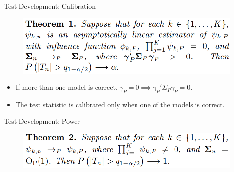 \documentclass{beamer}
\begin{document}
\begin{frame}{Test Development: Calibration}
	\begin{figure}
		\center
		\includegraphics[scale=0.3]{theorem1.png}
	\end{figure}
	\vspace{1em}
	\begin{itemize}
		\item If more than one model is correct, $ \gamma_P = 0 \implies \gamma_P' \Sigma_P \gamma_P = 0 $.
		\item The test statistic is calibrated only when one of the models is correct.
	\end{itemize}
\end{frame}

\begin{frame}{Test Development: Power}
	\begin{figure}
		\center
		\includegraphics[scale=0.3]{theorem2.png}
	\end{figure}
\end{frame}
\end{document}
